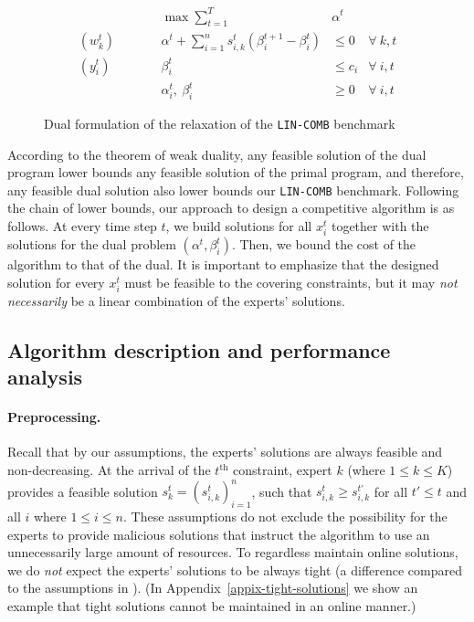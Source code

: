 \begin{figure}[ht]
	\begin{mdframed}
		\begin{align*}
			&& \max \sum_{t=1}^{T} & \alpha^{t} \\
			(w_{k}^{t}) \qquad && \alpha^{t} + \sum_{i=1}^{n} s_{i,k}^{t} ( \beta_{i}^{t+1} - \beta_{i}^{t})   &\leq 0  &\forall\ k,t\\
			(y_{i}^{t}) \qquad && \beta_{i}^{t}   &\leq c_{i}  &\forall\ i,t \\
			&& \alpha_{i}^{t},\ \beta_{i}^{t} & \ge 0 & \forall\ i,t
		\end{align*}
	\end{mdframed}
	\caption{Dual formulation of the relaxation of the \texttt{LIN-COMB} benchmark}
	\label{fig:dual}
\end{figure}


According to the theorem of weak duality, any feasible solution of the dual program lower bounds any feasible solution of the primal program, and therefore, any feasible dual solution also lower bounds our \texttt{LIN-COMB} benchmark. Following the chain of lower bounds, our approach to design a competitive algorithm is as follows. At every time step $t$, we build solutions for all $x_{i}^{t}$ together with the solutions for the dual problem $(\alpha^{t}, \beta_{i}^{t})$. Then, we bound the cost of the algorithm to that of the dual. It is important to emphasize that the designed solution for every $x_{i}^{t}$ must be feasible to the covering constraints, but it may \emph{not necessarily} be a linear combination of the experts' solutions.

\subsection{Algorithm description and performance analysis} \label{sec:algo}

\paragraph{Preprocessing.}
Recall that by our assumptions, the experts' solutions are always feasible and non-decreasing. At the arrival of the $t^{\text{th}}$ constraint, expert $k$ (where $1 \leq k \leq K$) provides a feasible solution $s_{k}^{t} = (s_{i,k}^{t})_{i=1}^{n}$, such that $s_{i,k}^{t} \ge s_{i,k}^{t'}$ for all $t' \le t$ and all $i$ where $1 \le i \le n$. These assumptions do not exclude the possibility for the experts to provide malicious solutions that instruct the algorithm to use an unnecessarily large amount of resources.
To regardless maintain online solutions, we do \emph{not} expect the experts' solutions to be always tight (a difference compared to the assumptions in \cite{AnandGe22:Online-Algorithms}).
(In Appendix~\ref{appix-tight-solutions}
we show an example that tight solutions cannot be maintained in an online manner.)


